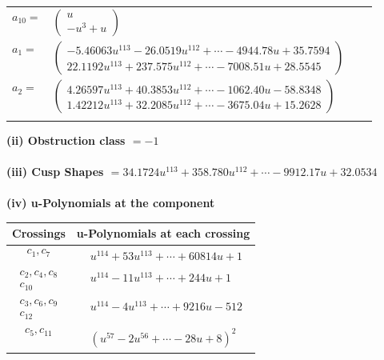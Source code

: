 \documentclass[1p]{elsarticle_modified}
\theoremstyle{definition}
\begin{document}
\begin{tabular}{m{7pt} m{180pt} m{7pt} m{180pt} }
\flushright $a_{10}=$&$\begin{pmatrix}u\\- u^3+u\end{pmatrix}$ \\
\flushright $a_{1}=$&$\begin{pmatrix}-5.46063 u^{113}-26.0519 u^{112}+\cdots-4944.78 u+35.7594\\22.1192 u^{113}+237.575 u^{112}+\cdots-7008.51 u+28.5545\end{pmatrix}$ \\
\flushright $a_{2}=$&$\begin{pmatrix}4.26597 u^{113}+40.3853 u^{112}+\cdots-1062.40 u-58.8348\\1.42212 u^{113}+32.2085 u^{112}+\cdots-3675.04 u+15.2628\end{pmatrix}$\\&\end{tabular}
\flushleft \textbf{(ii) Obstruction class $= -1$}\\~\\
\flushleft \textbf{(iii) Cusp Shapes $= 34.1724 u^{113}+358.780 u^{112}+\cdots-9912.17 u+32.0534$}\\~\\
\newpage\renewcommand{\arraystretch}{1}
\flushleft \textbf{(iv) u-Polynomials at the component}\newline \\
\begin{tabular}{m{50pt}|m{274pt}}
Crossings & \hspace{64pt}u-Polynomials at each crossing \\
\hline $$\begin{aligned}c_{1},c_{7}\end{aligned}$$&$\begin{aligned}
&u^{114}+53 u^{113}+\cdots+60814 u+1
\end{aligned}$\\
\hline $$\begin{aligned}c_{2},c_{4},c_{8}\\c_{10}\end{aligned}$$&$\begin{aligned}
&u^{114}-11 u^{113}+\cdots+244 u+1
\end{aligned}$\\
\hline $$\begin{aligned}c_{3},c_{6},c_{9}\\c_{12}\end{aligned}$$&$\begin{aligned}
&u^{114}-4 u^{113}+\cdots+9216 u-512
\end{aligned}$\\
\hline $$\begin{aligned}c_{5},c_{11}\end{aligned}$$&$\begin{aligned}
&(u^{57}-2 u^{56}+\cdots-28 u+8)^{2}
\end{aligned}$\\
\hline
\end{tabular}\\~\\
\end{document}
